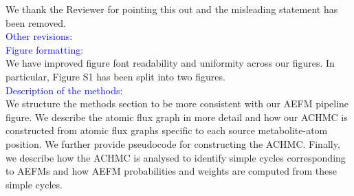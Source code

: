 \documentclass[11pt]{article}
\begin{document}
We thank the Reviewer for pointing this out and the misleading statement has
been removed.\\

\noindent\textcolor{blue}{Other revisions:}\\

\noindent\textcolor{blue}{Figure formatting:}\\

We have improved figure font readability and uniformity across our figures. In
particular, Figure S1 has been split into two figures.\\

\noindent\textcolor{blue}{Description of the methods:}\\

We structure the methods section to be more consistent with our AEFM pipeline
figure. We describe the atomic flux graph in more detail and how our ACHMC is
constructed from atomic flux graphs specific to each source
metabolite-atom position. We further provide pseudocode for constructing
the ACHMC. Finally, we describe how the ACHMC is analysed to identify
simple cycles corresponding to AEFMs and how AEFM probabilities and
weights are computed from these simple cycles.
\end{document}
